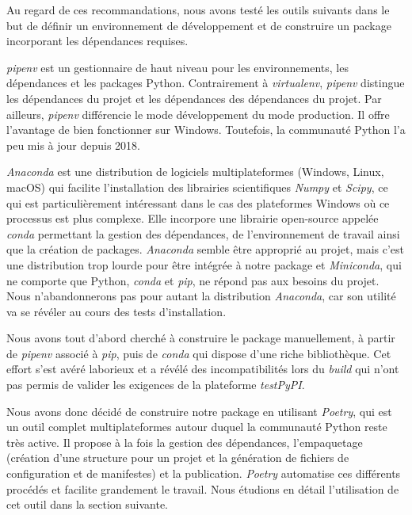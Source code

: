 \documentclass[twoside,a4paper,11pt,frenchb,openany]{report}
\begin{document}
Au regard de ces recommandations, nous avons testé les outils suivants dans le but de définir un environnement de développement et de construire un package incorporant les dépendances requises.

\textit{pipenv} est un gestionnaire de haut niveau pour les environnements, les dépendances et les packages Python. Contrairement à \textit{virtualenv}, \textit{pipenv} distingue les dépendances du projet et les dépendances des dépendances du projet. Par ailleurs, \textit{pipenv} différencie le mode développement du mode production. Il offre l'avantage de bien fonctionner sur Windows. Toutefois, la communauté Python l'a peu mis à jour depuis 2018.

\textit{Anaconda} est une distribution de logiciels multiplateformes (Windows, Linux, macOS) qui facilite l'installation des librairies scientifiques \textit{Numpy} et \textit{Scipy}, ce qui est particulièrement intéressant dans le cas des plateformes Windows où ce processus est plus complexe. Elle incorpore une librairie open-source appelée \textit{conda} permettant la gestion des dépendances, de l'environnement de travail ainsi que la création de packages. \textit{Anaconda} semble être approprié au projet, mais c'est une distribution trop lourde pour être intégrée à notre package et \textit{Miniconda}, qui ne comporte que Python, \textit{conda} et \textit{pip}, ne répond pas aux besoins du projet. Nous n'abandonnerons pas pour autant la distribution \textit{Anaconda}, car son utilité va se révéler au cours des tests d'installation. 

Nous avons tout d'abord cherché à construire le package manuellement, à partir de \textit{pipenv} associé à \textit{pip}, puis de \textit{conda} qui dispose d'une riche bibliothèque. Cet effort s'est avéré laborieux et a révélé des incompatibilités lors du \textit{build} qui n'ont pas permis de valider les exigences de la plateforme \textit{testPyPI}.

Nous avons donc décidé de construire notre package en utilisant \textit{Poetry}, qui est un outil complet multiplateformes autour duquel la communauté Python reste très active. Il propose à la fois la gestion des dépendances, l'empaquetage (création d'une structure pour un projet et la génération de fichiers de configuration et de manifestes) et la publication. \textit{Poetry} automatise ces différents procédés et facilite grandement le travail. Nous étudions en détail l'utilisation de cet outil dans la section suivante.
	
\end{document}
